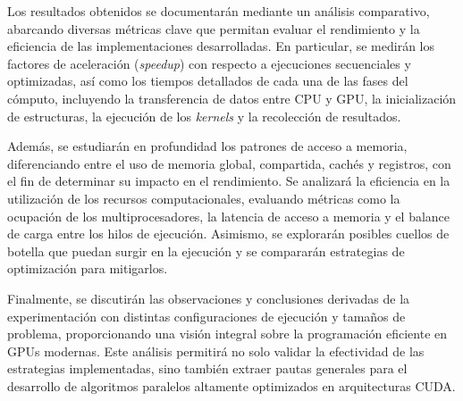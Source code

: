 Los resultados obtenidos se documentarán mediante un análisis comparativo, abarcando diversas métricas clave que permitan evaluar el rendimiento y la eficiencia de las implementaciones desarrolladas. En particular, se medirán los factores de aceleración (\textit{speedup}) con respecto a ejecuciones secuenciales y optimizadas, así como los tiempos detallados de cada una de las fases del cómputo, incluyendo la transferencia de datos entre CPU y GPU, la inicialización de estructuras, la ejecución de los \textit{kernels} y la recolección de resultados.  

Además, se estudiarán en profundidad los patrones de acceso a memoria, diferenciando entre el uso de memoria global, compartida, cachés y registros, con el fin de determinar su impacto en el rendimiento. Se analizará la eficiencia en la utilización de los recursos computacionales, evaluando métricas como la ocupación de los multiprocesadores, la latencia de acceso a memoria y el balance de carga entre los hilos de ejecución. Asimismo, se explorarán posibles cuellos de botella que puedan surgir en la ejecución y se compararán estrategias de optimización para mitigarlos.  

Finalmente, se discutirán las observaciones y conclusiones derivadas de la experimentación con distintas configuraciones de ejecución y tamaños de problema, proporcionando una visión integral sobre la programación eficiente en GPUs modernas. Este análisis permitirá no solo validar la efectividad de las estrategias implementadas, sino también extraer pautas generales para el desarrollo de algoritmos paralelos altamente optimizados en arquitecturas CUDA.
